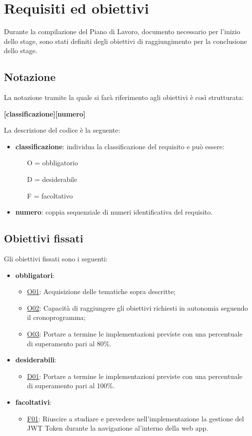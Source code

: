 \section{Requisiti ed obiettivi}
\label{sec:requisiti-obiettivi}
Durante la compilazione del Piano di Lavoro, documento necessario per l'inizio dello stage, sono stati definiti degli obiettivi di raggiungimento per la conclusione dello stage.

\subsection{Notazione}
\label{subsec:notazione}
La notazione tramite la quale si farà riferimento agli obiettivi è così strutturata:
\begin{center}
	\textbf{[classificazione][numero]}
\end{center}
La descrizione del codice è la seguente:
\begin{itemize}
	\item \textbf{classificazione}: individua la classificazione del requisito e può essere:
	\begin{itemize}
		\item [O =] obbligatorio
		\item [D =] desiderabile
		\item [F =] facoltativo
	\end{itemize}
\item \textbf{numero}: coppia sequenziale di numeri identificativa del requisito.
\end{itemize}
\subsection{Obiettivi fissati}
\label{subsec:obiettivi-fissati}
Gli obiettivi fissati sono i seguenti:
\begin{itemize}
	\item \textbf{obbligatori}:
	\begin{itemize}
		\item \underline{O01}: Acquisizione delle tematiche sopra descritte;
		\item \underline{O02}: Capacità di raggiungere gli obiettivi richiesti in autonomia seguendo il cronoprogramma;
		\item \underline{O03}: Portare a termine le implementazioni previste con una percentuale di superamento pari al 80\%.
	\end{itemize}
	\item \textbf{desiderabili}:
	\begin{itemize}
		\item \underline{D01}: Portare a termine le implementazioni previste con una percentuale di superamento pari al 100\%.
	\end{itemize}
	\item \textbf{facoltativi}:
	\begin{itemize}
		\item \underline{F01}: Riuscire a studiare e prevedere nell'implementazione la gestione del JWT Token durante la navigazione al'interno della web app.
	\end{itemize}
\end{itemize}